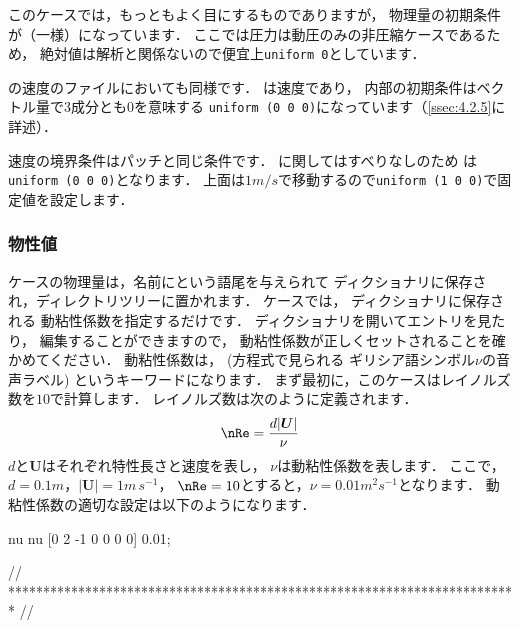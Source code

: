 このケースでは，もっともよく目にするものでありますが，
物理量の初期条件が（一様）になっています．
ここでは圧力は動圧のみの非圧縮ケースであるため，
絶対値は解析と関係ないので便宜上\texttt{uniform 0}としています．

の速度のファイルにおいても同様です．
は速度であり，
内部の初期条件はベクトル量で3成分とも$0$を意味する
\texttt{uniform (0 0 0)}になっています（\autoref{ssec:4.2.5}に詳述）．

速度の境界条件はパッチと同じ条件です．
に関してはすべりなしのため
%
%
は\texttt{uniform (0 0 0)}となります．
上面は$1\unit{m/s}$で移動するので\texttt{uniform (1 0 0)}で固定値を設定します．

\subsubsection{物性値}
\label{sssec:2.1.1.3}
ケースの物理量は，名前にという語尾を与えられて
ディクショナリに保存され，ディレクトリツリーに置かれます．
%
%
ケースでは，
%
%
ディクショナリに保存される
動粘性係数を指定するだけです．
ディクショナリを開いてエントリを見たり，
編集することができますので，
%
動粘性係数が正しくセットされることを確かめてください．
動粘性係数は， (方程式で見られる
ギリシア語シンボル$\nu$の音声ラベル)
というキーワードになります．
まず最初に，このケースはレイノルズ数を$10$で計算します．
%
レイノルズ数は次のように定義されます．
\begin{align}
 \label{eq:2.1}
 \nRe = \frac{d|\bm{U}|}{\nu}
\end{align}
$d$と$\bm{U}$はそれぞれ特性長さと速度を表し，
$\nu$は動粘性係数を表します．
ここで，$d = 0.1\unit{m}$，$|\bm{U}| = 1\unit{m\,s^{-1}}$，
$\nRe = 10$とすると，$\nu = 0.01\unit{m^{2}s^{-1}}$となります．
動粘性係数の適切な設定は以下のようになります．
\begin{OFverbatim}[file, linenum=17]

nu              nu [0 2 -1 0 0 0 0] 0.01;


// ************************************************************************* //
\end{OFverbatim}

